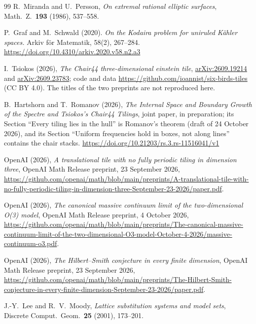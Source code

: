 \documentclass[11pt,a4paper]{article}
\theoremstyle{plain}
\theoremstyle{definition}
\begin{document}
\begin{thebibliography}{99}
R.~Miranda and U.~Persson,
\emph{On extremal rational elliptic surfaces},
Math.\ Z.\ \textbf{193} (1986), 537--558.

P.~Graf and M.~Schwald (2020). 
\emph{On the Kodaira problem for uniruled Kähler spaces.}
Arkiv för Matematik, 58(2), 267–284. 
\url{https://doi.org/10.4310/arkiv.2020.v58.n2.a3}

I.~Tsiokos (2026),
\emph{The Chair44 three-dimensional einstein tile},
\href{https://arxiv.org/abs/2609.19214}{arXiv:2609.19214} and
\href{https://arxiv.org/abs/2609.23783}{arXiv:2609.23783};
code and data \url{https://github.com/ioannist/six-birds-tiles} (CC BY 4.0).
The titles of the two preprints are not reproduced here.

B.~Hartshorn and T.~Romanov (2026),
\emph{The Internal Space and Boundary Growth of the Spectre and Tsiokos's Chair44 Tilings},
joint paper, in preparation; its Section ``Every tiling lies in the hull'' is Romanov's theorem
(draft of 24 October 2026), and its Section ``Uniform frequencies hold in boxes, not along lines''
contains the chair stacks. \url{https://doi.org/10.21203/rs.3.rs-11516041/v1}

OpenAI (2026),
\emph{A translational tile with no fully periodic tiling in dimension three},
OpenAI Math Release preprint, 23 September 2026,
\newline
\url{https://github.com/openai/math/blob/main/preprints/A-translational-tile-with-no-fully-periodic-tiling-in-dimension-three-September-23-2026/paper.pdf}.

OpenAI (2026),
\emph{The canonical massive continuum limit of the two-dimensional O(3) model},
OpenAI Math Release preprint, 4 October 2026,
\newline
\url{https://github.com/openai/math/blob/main/preprints/The-canonical-massive-continuum-limit-of-the-two-dimensional-O3-model-October-4-2026/massive-continuum-o3.pdf}.

OpenAI (2026),
\emph{The Hilbert--Smith conjecture in every finite dimension},
OpenAI Math Release preprint, 23 September 2026,
\newline
\url{https://github.com/openai/math/blob/main/preprints/The-Hilbert-Smith-conjecture-in-every-finite-dimension-September-23-2026/paper.pdf}.

J.-Y.~Lee and R.~V.~Moody,
\emph{Lattice substitution systems and model sets},
Discrete Comput.\ Geom.\ \textbf{25} (2001), 173--201.


\end{thebibliography}
\end{document}
